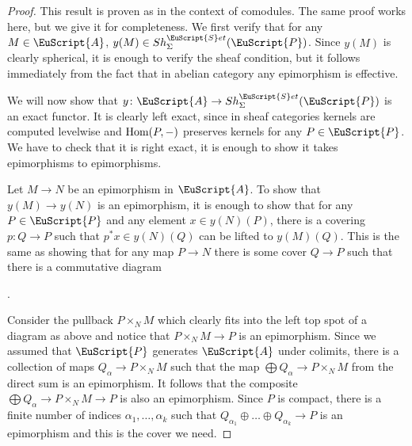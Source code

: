 \documentclass[oneside,a4paper]{amsart}
\newcommand{\euscr}[1]{\EuScript{#1}} %
\newcommand{\acat}{\euscr{A}} %
\newcommand{\pcat}{\euscr{P}} %
\newcommand{\Hom}{\textnormal{Hom}} %
\newcommand{\sets}{\euscr{S}et} %
\theoremstyle{plain}
\theoremstyle{definition}
\theoremstyle{remark}
\begin{document}
\begin{proof}
This result is proven as \cite[2.1.12]{moduli_problems_for_structured_ring_spectra} in the context of comodules. The same proof works here, but we give it for completeness. We first verify that for any $M \in \acat$, $y(M) \in Sh_{\Sigma}^{\sets}(\pcat)$. Since $y(M)$ is clearly spherical, it is enough to verify the sheaf condition, but it follows immediately from the fact that in abelian category any epimorphism is effective. 

We will now show that $y \colon \acat \rightarrow Sh_{\Sigma}^{\sets}(\pcat)$ is an exact functor. It is clearly left exact, since in sheaf categories kernels are computed levelwise and $\Hom(P, -)$ preserves kernels for any $P \in \pcat$. We have to check that it is right exact, it is enough to show it takes epimorphisms to epimorphisms. 

Let $M \rightarrow N$ be an epimorphism in $\acat$. To show that $y(M) \rightarrow y(N)$ is an epimorphism, it is enough to show that for any $P \in \pcat$ and any element $x \in y(N)(P)$, there is a covering $p \colon Q \rightarrow P$ such that $p^{*}x \in y(N)(Q)$ can be lifted to $y(M)(Q)$. This is the same as showing that for any map $P \rightarrow N$ there is some cover $Q \rightarrow P$ such that there is a commutative diagram 

\begin{center}
	.
\end{center}
Consider the pullback $P \times _{N} M$ which clearly fits into the left top spot of a diagram as above and notice that $P \times _{N} M \rightarrow P$ is an epimorphism. Since we assumed that $\pcat$ generates $\acat$ under colimits, there is a collection of maps $Q_{\alpha} \rightarrow P \times _{N} M$ such that the map $\bigoplus Q_{\alpha} \rightarrow P \times_{N} M$ from the direct sum is an epimorphism. It follows that the composite $\bigoplus Q_{\alpha} \rightarrow P\times _{N} M \rightarrow P$ is also an epimorphism. Since $P$ is compact, there is a finite number of indices $\alpha_{1}, \ldots, \alpha_{k}$ such that $Q_{\alpha_{1}} \oplus \ldots \oplus Q_{\alpha_{k}} \rightarrow P$ is an epimorphism and this is the cover we need. 


\end{proof}
\end{document}
